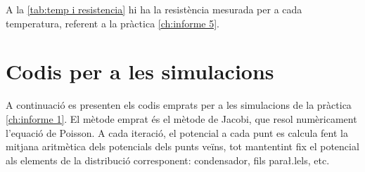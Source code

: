 A la \cref{tab:temp i resistencia} hi ha la resistència mesurada per a cada temperatura, referent a la pràctica \ref{ch:informe 5}.

\newpage
\section{Codis per a les simulacions}\label{sec:codis}
A continuació es presenten els codis emprats per a les simulacions de la pràctica \ref{ch:informe 1}. El mètode emprat és el mètode de Jacobi, que resol numèricament l'equació de Poisson. A cada iteració, el potencial a cada punt es calcula fent la mitjana aritmètica dels potencials dels punts veïns, tot mantentint fix el potencial als elements de la distribució corresponent: condensador, fils para\l.lels, etc.  





